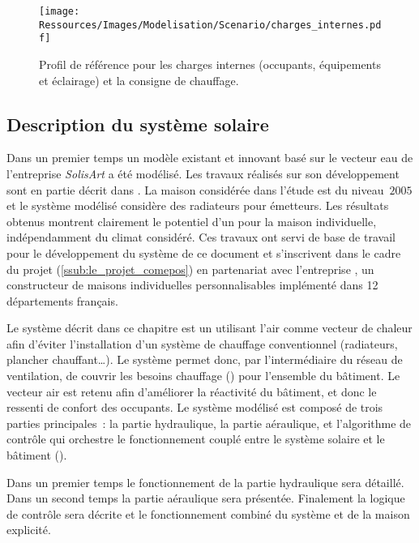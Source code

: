 \begin{figure}
    \centering
    \texttt{[image: Ressources/Images/Modelisation/Scenario/charges\_internes.pdf]}
    \caption[Profil de référence pour les charges internes et la consigne de chauffage]
            {Profil de référence pour les charges internes (occupants, équipements et éclairage)
             et la consigne de chauffage.}
    \label{fig:scenario_reference}
\end{figure}


\subsection{Description du système solaire} %
\label{sub:description_du_systeme_solaire}
Dans un premier temps un modèle existant et innovant basé sur le vecteur eau
de l’entreprise \textit{SolisArt} a été modélisé. Les travaux réalisés sur son
développement sont en partie décrit dans \textcite{Bois2015}. La maison considérée dans
l’étude est du niveau \,$2005$ et le système modélisé considère des radiateurs
pour émetteurs. Les résultats obtenus montrent clairement le potentiel d’un 
pour la maison individuelle, indépendamment du climat considéré. Ces travaux
ont servi de base de travail pour le développement du système de ce document et
s’inscrivent dans le cadre du projet  (\ref{ssub:le_projet_comepos})
en partenariat avec l’entreprise , un constructeur de maisons individuelles
personnalisables implémenté dans \num{12} départements français.

Le système décrit dans ce chapitre est un  utilisant l’air comme vecteur de chaleur
afin d’éviter l’installation d’un système de chauffage conventionnel (radiateurs, plancher
chauffant\dots). Le système permet donc, par l’intermédiaire du réseau de ventilation, de
couvrir les besoins chauffage () pour l’ensemble du bâtiment.
Le vecteur air est retenu afin d’améliorer la réactivité du bâtiment, et donc le
ressenti de confort des occupants. Le système modélisé est composé de trois
parties principales~: la partie hydraulique, la partie aéraulique, et l’algorithme de
contrôle qui orchestre le fonctionnement couplé entre le système solaire et le bâtiment
().

Dans un premier temps le fonctionnement de la partie hydraulique sera détaillé. Dans un
second temps la partie aéraulique sera présentée. Finalement la logique de contrôle sera
décrite et le fonctionnement combiné du système et de la maison explicité.

